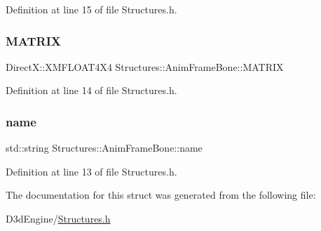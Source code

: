 Definition at line 15 of file Structures.\+h.

\mbox{\label{struct_structures_1_1_anim_frame_bone_a43cf9392104548b50bd0e2d68281b674}} 
\subsubsection{\texorpdfstring{M\+A\+T\+R\+IX}{MATRIX}}
{\footnotesize\ttfamily Direct\+X\+::\+X\+M\+F\+L\+O\+A\+T4\+X4 Structures\+::\+Anim\+Frame\+Bone\+::\+M\+A\+T\+R\+IX}



Definition at line 14 of file Structures.\+h.

\mbox{\label{struct_structures_1_1_anim_frame_bone_a8a1b25b30ddb0b2a415ae00291d7f7c1}} 
\subsubsection{\texorpdfstring{name}{name}}
{\footnotesize\ttfamily std\+::string Structures\+::\+Anim\+Frame\+Bone\+::name}



Definition at line 13 of file Structures.\+h.



The documentation for this struct was generated from the following file\+:\begin{DoxyCompactItemize}
\item 
D3d\+Engine/\mbox{\hyperlink{_structures_8h}{Structures.\+h}}\end{DoxyCompactItemize}
